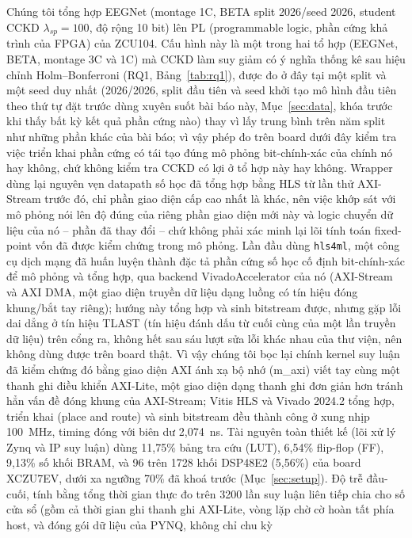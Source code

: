 \documentclass[11pt,a4paper,twoside,asymmetric]{article}
\begin{document}
Chúng tôi tổng hợp EEGNet (montage 1C, BETA split 2026/seed 2026, student CCKD $\lambda_{sp}=100$,
độ rộng 10 bit) lên PL (programmable logic, phần cứng khả trình của FPGA) của ZCU104. Cấu hình này là
một trong hai tổ hợp (EEGNet, BETA, montage 3C và 1C) mà CCKD làm suy giảm có ý nghĩa thống kê sau
hiệu chỉnh Holm--Bonferroni (RQ1, Bảng~\ref{tab:rq1}), được đo ở đây tại một split và một seed duy
nhất (2026/2026, split đầu tiên và seed khởi tạo mô hình đầu tiên theo thứ tự đặt trước dùng xuyên suốt bài báo này, Mục~\ref{sec:data}, khóa trước khi thấy bất kỳ kết quả phần cứng nào) thay vì lấy trung bình trên năm split như những phần khác của bài báo; vì vậy phép đo
trên board dưới đây kiểm tra việc triển khai phần cứng có tái tạo đúng mô phỏng bit-chính-xác của chính nó hay không, chứ không kiểm tra CCKD có lợi ở tổ hợp này hay không. Wrapper dùng lại nguyên vẹn datapath số học đã tổng hợp bằng HLS từ lần thử AXI-Stream trước đó, chỉ phần giao diện cấp cao nhất là khác, nên việc khớp sát với mô phỏng nói lên độ đúng của riêng phần giao diện mới này và logic chuyển dữ liệu của nó -- phần đã thay đổi -- chứ không phải xác minh lại lõi tính toán fixed-point vốn đã được kiểm chứng trong mô phỏng. Lần đầu dùng
\texttt{hls4ml}, một công cụ dịch mạng đã huấn luyện thành đặc tả phần cứng số học cố định
bit-chính-xác để mô phỏng và tổng hợp, qua backend VivadoAccelerator của nó (AXI-Stream và AXI DMA,
một giao diện truyền dữ liệu dạng luồng có tín hiệu đóng khung/bắt tay riêng); hướng này tổng hợp và
sinh bitstream được, nhưng gặp lỗi dai dẳng ở tín hiệu TLAST (tín hiệu đánh dấu từ cuối cùng của một
lần truyền dữ liệu) trên cổng ra, không hết sau sáu lượt sửa lỗi khác nhau của thư viện, nên không
dùng được trên board thật. Vì vậy chúng tôi bọc lại chính kernel suy luận đã kiểm chứng đó bằng giao
diện AXI ánh xạ bộ nhớ (m\_axi) viết tay cùng một thanh ghi điều khiển AXI-Lite, một giao diện dạng
thanh ghi đơn giản hơn tránh hẳn vấn đề đóng khung của AXI-Stream; Vitis HLS và Vivado 2024.2 tổng
hợp, triển khai (place and route) và sinh bitstream đều thành công ở xung nhịp 100~MHz, timing đóng
với biên dư 2,074~ns. Tài nguyên toàn thiết kế (lõi xử lý Zynq và IP suy luận) dùng 11,75\% bảng tra
cứu (LUT), 6,54\% flip-flop (FF), 9,13\% số khối BRAM, và 96 trên 1728 khối DSP48E2 (5,56\%) của board
XCZU7EV, dưới xa ngưỡng 70\% đã khoá trước (Mục~\ref{sec:setup}). Độ trễ đầu-cuối, tính
bằng tổng thời gian thực đo trên 3200 lần suy luận liên tiếp chia cho số cửa sổ (gồm cả thời gian ghi
thanh ghi AXI-Lite, vòng lặp chờ cờ hoàn tất phía host, và đóng gói dữ liệu của PYNQ, không chỉ chu kỳ
\end{document}
